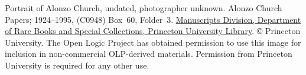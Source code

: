 Portrait of Alonzo Church, undated, photographer unknown. Alonzo
Church Papers; 1924--1995, (C0948) Box~60,
Folder~3. \href{http://rbsc.princeton.edu/divisions/manuscripts-division}{Manuscripts
Division, Department of Rare Books and Special Collections, Princeton
University Library}. \copyright{} Princeton University. The Open Logic
Project has obtained permission to use this image for inclusion in
non-commercial OLP-derived materials. Permission from Princeton
University is required for any other use.
